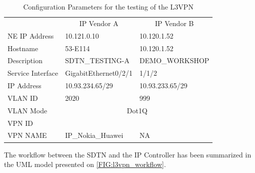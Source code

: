 \documentclass[a4paper,fleqn]{cas-dc}
\begin{document}
\begin{table}[]
\caption{Configuration Parameters for the testing of the L3VPN}
\begin{adjustbox}{width=0.5\textwidth}
\small
\begin{tabular}{lll}
& \multicolumn{1}{c}{IP Vendor A} & \multicolumn{1}{c}{IP Vendor B} \\
{\color[HTML]{000000} NE IP Address} & {\color[HTML]{000000} 10.121.0.10}          & {\color[HTML]{000000} 10.120.1.52}     \\
\rowcolor[HTML]{F2F2F2} 
{\color[HTML]{000000} Hostname}            & {\color[HTML]{000000} 53-E114}              & {\color[HTML]{000000} 10.120.1.52}     \\
{\color[HTML]{000000} Description}         & {\color[HTML]{000000} SDTN\_TESTING-A}      & {\color[HTML]{000000} DEMO\_WORKSHOP} \\
\rowcolor[HTML]{F2F2F2} 
{\color[HTML]{000000} Service   Interface} & {\color[HTML]{000000} GigabitEthernet0/2/1} & {\color[HTML]{000000} 1/1/2}           \\
{\color[HTML]{000000} IP Address}          & {\color[HTML]{000000} 10.93.234.65/29}      & {\color[HTML]{000000} 10.93.233.65/29} \\
\rowcolor[HTML]{F2F2F2} 
{\color[HTML]{000000} VLAN   ID}           & {\color[HTML]{000000} 2020}                 & {\color[HTML]{000000} 999}             \\
{\color[HTML]{000000} VLAN Mode}           & \multicolumn{2}{c}{{\color[HTML]{000000} Dot1Q}}                                     \\
\rowcolor[HTML]{F2F2F2} 
{\color[HTML]{000000} VPN   ID}            & \multicolumn{2}{c}{\cellcolor[HTML]{F2F2F2}{\color[HTML]{000000} 15}} \\
{\color[HTML]{000000} VPN NAME}           & {\color[HTML]{000000} IP\_Nokia\_Huawei}                 & {\color[HTML]{000000} NA} 
\end{tabular}
\end{adjustbox}
\label{TAB:discovered_ip_l3vpn}
\end{table}

The workflow between the SDTN and the IP Controller has been summarized in the UML model presented on \cref{FIG:l3vpn_workflow}. 
\end{document}
